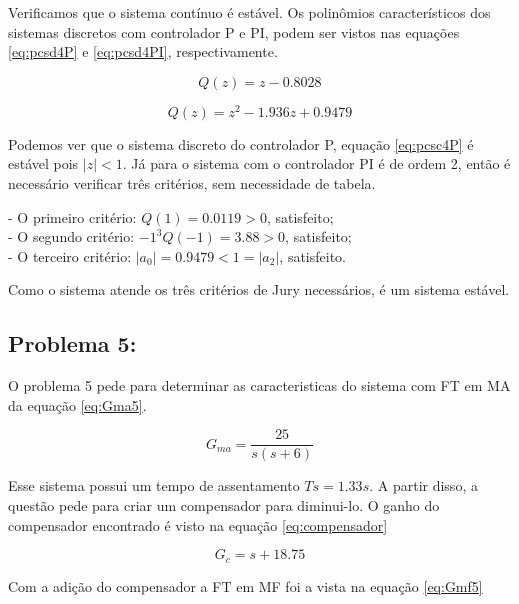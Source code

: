 Verificamos que o sistema contínuo é estável.
Os polinômios característicos dos sistemas discretos com controlador P e PI, podem ser vistos nas equações
\ref{eq:pcsd4P} e \ref{eq:pcsd4PI}, respectivamente.

\begin{equation}
    Q(z) = z - 0.8028                                                          
    \label{eq:pcsd4P}
\end{equation}

\begin{equation}
    Q(z) = z^2 - 1.936 z +  0.9479                                                       
    \label{eq:pcsd4PI}
\end{equation}

Podemos ver que o sistema discreto do controlador P, equação \ref{eq:pcsc4P} é estável pois $|z|<1$. Já para o 
sistema com o controlador PI é de ordem 2, então é necessário verificar três critérios, sem necessidade de tabela.

- O primeiro critério: $Q(1)= 0.0119 > 0$, satisfeito; \\
- O segundo critério: $-1^3 Q(-1) = 3.88 > 0$, satisfeito;\\
- O terceiro critério: $|a_0| = 0.9479 < 1 = |a_2|$, satisfeito.

Como o sistema atende os três critérios de Jury necessários, é um sistema estável. 

\subsection*{Problema 5:}

O problema 5 pede para determinar as caracteristicas do sistema com FT em MA da equação \ref{eq:Gma5}.

\begin{equation}
    G_{ma} =  \frac{25}{s(s+6)}
    \label{eq:Gma5}
\end{equation}

Esse sistema possui um tempo de assentamento $Ts = 1.33s$. A partir disso, a questão pede para criar um
compensador para diminui-lo. O ganho do compensador encontrado é visto na equação \ref{eq:compensador}

\begin{equation}
    G_c = s + 18.75
    \label{eq:compensador}
\end{equation}

Com a adição do compensador a FT em MF foi a vista na equação \ref{eq:Gmf5}

